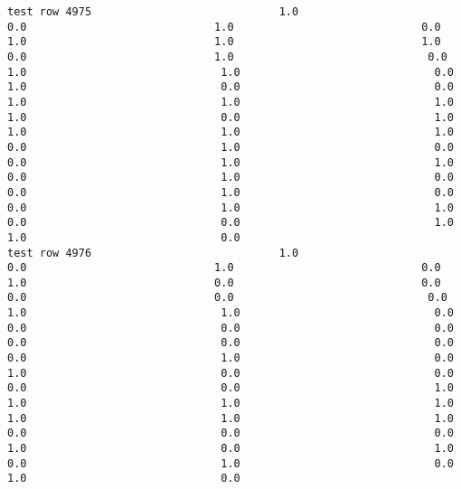 \documentclass[11pt]{article}
\begin{document}
\begin{verbatim}
test row 4975                             1.0                             0.0                             1.0                             0.0                             1.0                             1.0                             1.0                             0.0                             1.0                              0.0                              1.0                              1.0                              0.0                              1.0                              0.0                              0.0                              1.0                              1.0                              1.0                              1.0                              0.0                              1.0                              1.0                              1.0                              1.0                              0.0                              1.0                              0.0                              0.0                              1.0                              1.0                              0.0                              1.0                              0.0                              0.0                              1.0                              0.0                              0.0                              1.0                              1.0                              0.0                              0.0                              1.0                              1.0                              0.0
test row 4976                             1.0                             0.0                             1.0                             0.0                             1.0                             0.0                             0.0                             0.0                             0.0                              0.0                              1.0                              1.0                              0.0                              0.0                              0.0                              0.0                              0.0                              0.0                              0.0                              0.0                              1.0                              0.0                              1.0                              0.0                              0.0                              0.0                              0.0                              1.0                              1.0                              1.0                              1.0                              1.0                              1.0                              1.0                              0.0                              0.0                              0.0                              1.0                              0.0                              1.0                              0.0                              1.0                              0.0                              1.0                              0.0

\end{verbatim}
\end{document}
